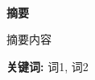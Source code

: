 
\setcounter{page}{1}
\pagestyle{artimain}

\ \\\vspace*{-3.5em}
\begin{center}
\textbf{\heiti 摘\quad 要}
\end{center}
\vspace{0.5em}\songti
\par 摘要内容
\vspace{1.5em}\par\noindent\textbf{\songti 关键词: }词1, 词2
\vspace{2em}\songti